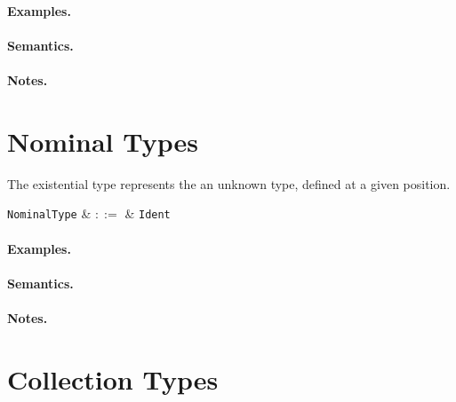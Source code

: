 \paragraph{Examples.}

\paragraph{Semantics.}

\paragraph{Notes.}


\section{Nominal Types}

The existential type represents the an unknown type, defined at a given position.

\begin{syntax}
  \verb+NominalType+ & $::=$ & \verb+Ident+\\
\end{syntax}

\paragraph{Examples.}

\paragraph{Semantics.}

\paragraph{Notes.}


\section{Collection Types}


